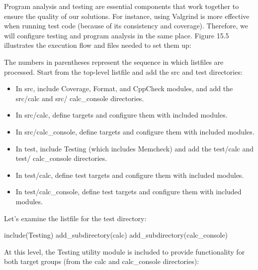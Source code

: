 
Program analysis and testing are essential components that work together to ensure the quality of our solutions. For instance, using Valgrind is more effective when running test code (because of its consistency and coverage). Therefore, we will configure testing and program analysis in the same place. Figure 15.5 illustrates the execution flow and files needed to set them up:


The numbers in parentheses represent the sequence in which listfiles are processed. Start from the top-level listfile and add the src and test directories:

\begin{itemize}
\item
In src, include Coverage, Format, and CppCheck modules, and add the src/calc and src/ calc\_console directories.

\item
In src/calc, define targets and configure them with included modules.

\item
In src/calc\_console, define targets and configure them with included modules.

\item
In test, include Testing (which includes Memcheck) and add the test/calc and test/ calc\_console directories.

\item
In test/calc, define test targets and configure them with included modules.

\item
In test/calc\_console, define test targets and configure them with included modules.
\end{itemize}

Let’s examine the listfile for the test directory:


\begin{cmake}
include(Testing)
add_subdirectory(calc)
add_subdirectory(calc_console)
\end{cmake}

At this level, the Testing utility module is included to provide functionality for both target groups (from the calc and calc\_console directories):


